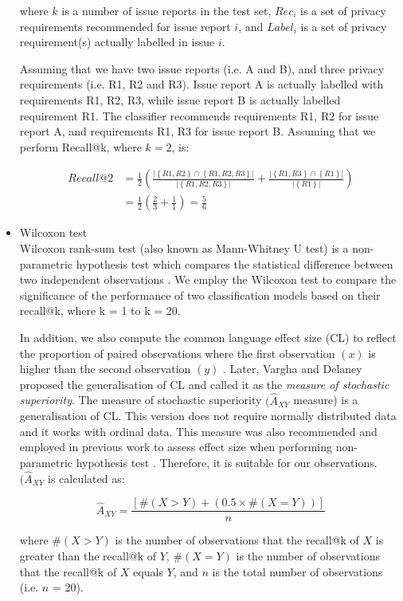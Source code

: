 \begin{itemize}[leftmargin=3mm]
	where $k$ is a number of issue reports in the test set, $Rec_{i}$ is a set of privacy requirements recommended for issue report $i$, and $Label_{i}$ is a set of privacy requirement(s) actually labelled in issue $i$. 
	
	Assuming that we have two issue reports (i.e. A and B), and three privacy requirements (i.e. R1, R2 and R3). Issue report A is actually labelled with requirements {R1, R2, R3}, while issue report B is actually labelled requirement {R1}. The classifier recommends requirements {R1, R2} for issue report A, and requirements {R1, R3} for issue report B. Assuming that we perform Recall@k, where $k = 2$, is:

	\begin{equation}
		\begin{split}
			Recall@2 & = \frac{1}{2} \left ( \frac{ \lvert \left \{ R1, R2 \right \} \cap \left \{ R1, R2, R3 \right \} \rvert}{\lvert \left \{ R1, R2, R3 \right \} \rvert} + \frac{ \lvert \left \{ R1, R3 \right \} \cap \left \{ R1 \right \} \rvert}{\lvert \left \{ R1 \right \} \rvert} \right ) \\
			& = \frac{1}{2}\left ( \frac{2}{3} + \frac{1}{1} \right ) = \frac{5}{6}
		\end{split}
	\end{equation}
	
	\item Wilcoxon test \\
	Wilcoxon rank-sum test (also known as Mann-Whitney U test) is a non-parametric hypothesis test which compares the statistical difference between two independent observations \cite{Wild1997}. We employ the Wilcoxon test to compare the significance of the performance of two classification models based on their recall@k, where k = 1 to k = 20. 
	
	In addition, we also compute the common language effect size (CL) to reflect the proportion of paired observations where the first observation $(x)$ is higher than the second observation $(y)$ \cite{McGraw1992a}. Later, Vargha and Delaney \cite{Vargha2000} proposed the generalisation of CL and called it as the \emph{measure of stochastic superiority}. The measure of stochastic superiority $(\hat{A}_{XY}$ measure) is a generalisation of CL. This version does not require normally distributed data and it works with ordinal data. This measure was also recommended and employed in previous work to assess effect size when performing non-parametric hypothesis test \cite{Arcuri2014, Choetkiertikul2018}. Therefore, it is suitable for our observations. $(\hat{A}_{XY}$ is calculated as:
	
	\begin{equation}
		\hat{A}_{XY} = \frac{\left [ \# \left ( X > Y \right ) + \left ( 0.5 \times \#\left ( X = Y \right ) \right ) \right ]}{n}
	\end{equation}
	
	where $\#(X > Y)$ is the number of observations that the recall@k of $X$ is greater than the recall@k of $Y$, $\#(X = Y)$ is the number of observations that the recall@k of $X$ equals $Y$, and $n$ is the total number of observations (i.e. $n$ = 20).
	
\end{itemize}

